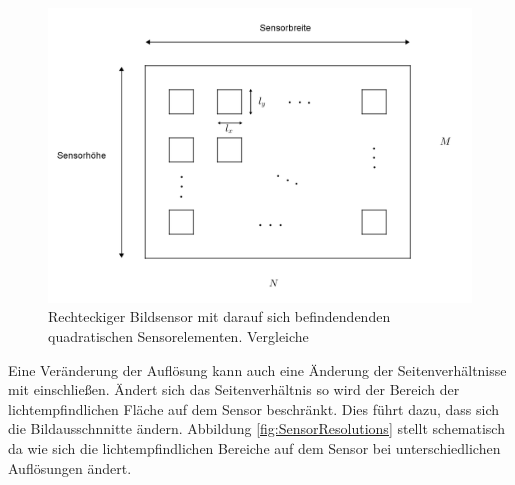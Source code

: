 \begin{figure}[!htb]
	\centering
	\includegraphics[width=.8\linewidth]{images/Bildsensor_mit_Pixel.png}
	\caption[Aufbau von CMOS-Sensoren]{Rechteckiger Bildsensor mit darauf sich befindendenden quadratischen Sensorelementen. Vergleiche \cite{Photonik}} 
	\label{fig:Sensor}
\end{figure}
\pagebreak

Eine Veränderung der Auflösung kann auch eine Änderung der Seitenverhältnisse mit einschließen. Ändert sich das Seitenverhältnis so wird der Bereich der lichtempfindlichen Fläche auf dem Sensor beschränkt\cite{Photonik}. Dies führt dazu, dass sich die Bildausschnnitte ändern. Abbildung \ref{fig:SensorResolutions} stellt schematisch da wie sich die lichtempfindlichen Bereiche auf dem Sensor bei unterschiedlichen Auflösungen ändert.







